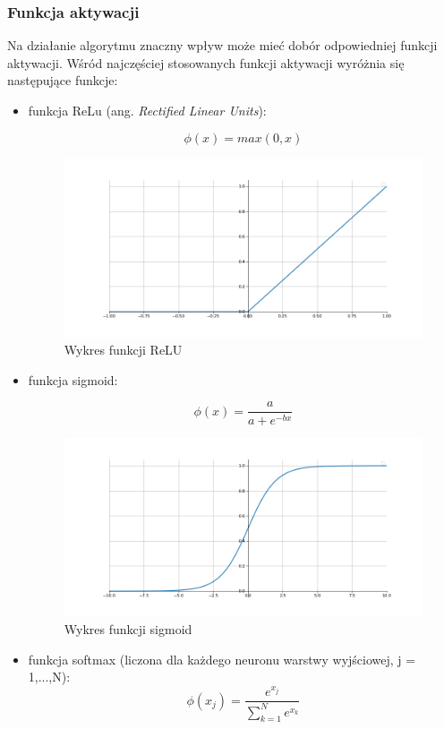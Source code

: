\subsubsection{Funkcja aktywacji}
Na działanie algorytmu znaczny wpływ może mieć dobór odpowiedniej 
funkcji aktywacji. Wśród najczęściej stosowanych funkcji aktywacji
wyróżnia się następujące funkcje:
\begin{itemize}
    \item funkcja ReLu (ang. \emph{Rectified Linear Units}): 
    
    $$\phi(x) = max(0, x)$$
    \begin{figure}[!h]
      \centering
      \includegraphics[width=\textwidth]{img/relu.png}
      \caption{Wykres funkcji ReLU}
      \label{sigmoid}
    \end{figure}

    \item funkcja sigmoid: 
    
    $$\phi(x) = \frac{a}{a + e^{-bx}}$$
    \begin{figure}[!h]
      \centering
      \includegraphics[width=\textwidth]{img/sigmoid.png}
      \caption{Wykres funkcji sigmoid}
      \label{sigmoid}
    \end{figure}
    
    \item funkcja softmax (liczona dla każdego neuronu warstwy wyjściowej, j = 1,...,N): 
    $$\phi(x_j) = \frac{e^{x_j}}{\sum_{k=1}^{N}{e^{x_k}}}$$
\end{itemize}

